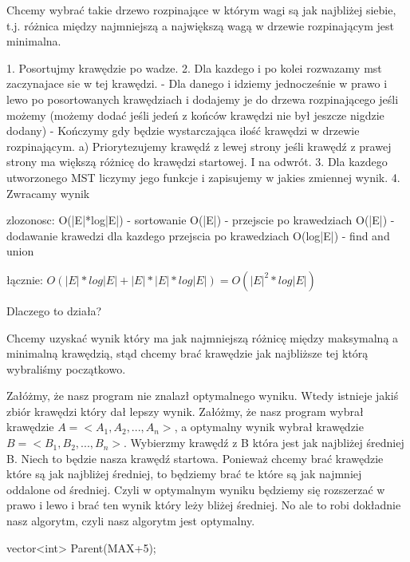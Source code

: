 \documentclass[12pt]{article}
\begin{document}




Chcemy wybrać takie drzewo rozpinające w którym wagi są jak najbliżej siebie, t.j. różnica między najmniejszą a największą wagą w drzewie rozpinającym jest minimalna.


1. Posortujmy krawędzie po wadze. 
2. Dla kazdego i po kolei rozwazamy mst zaczynajace sie w tej krawędzi. 
- Dla danego i idziemy jednocześnie w prawo i lewo po posortowanych krawędziach i dodajemy je do drzewa rozpinającego jeśli możemy (możemy dodać jeśli jedeń z końców krawędzi nie był jeszcze nigdzie dodany)
- Kończymy gdy będzie wystarczająca ilość krawędzi w drzewie rozpinającym.
a) Priorytezujemy krawędź z lewej strony jeśli krawędź z prawej strony ma większą różnicę do krawędzi startowej. I na odwrót.
3. Dla kazdego utworzonego MST liczymy jego funkcje i zapisujemy w jakies zmiennej wynik.
4. Zwracamy wynik

zlozonosc:
O(|E|*log|E|) - sortowanie
O(|E|) - przejscie po krawedziach
O(|E|) - dodawanie krawedzi dla kazdego przejscia po krawedziach 
O(log|E|) - find and union 

łącznie:
$O(|E|*log|E| + |E|*|E|*log|E|) = O(|E|^2*log|E|)$


Dlaczego to działa?

Chcemy uzyskać wynik który ma jak najmniejszą różnicę między maksymalną a minimalną krawędzią, stąd chcemy brać krawędzie jak najbliższe tej którą wybraliśmy początkowo.

Załóżmy, że nasz program nie znalazł optymalnego wyniku.
Wtedy istnieje jakiś zbiór krawędzi który dał lepszy wynik.
Załóżmy, że nasz program wybrał krawędzie $A = <A_1, A_2, ..., A_n>$, a optymalny wynik wybrał krawędzie $B = <B_1, B_2, ..., B_n>$.
Wybierzmy krawędź z B która jest jak najbliżej średniej B.
Niech to będzie nasza krawędź startowa. 
Ponieważ chcemy brać krawędzie które są jak najbliżej średniej, to będziemy brać te które są jak najmniej oddalone od średniej. Czyli w optymalnym wyniku będziemy się rozszerzać w prawo i lewo i brać ten wynik który leży bliżej średniej.
No ale to robi dokładnie nasz algorytm, czyli nasz algorytm jest optymalny.




vector<int> Parent(MAX+5);
 
\end{document}
